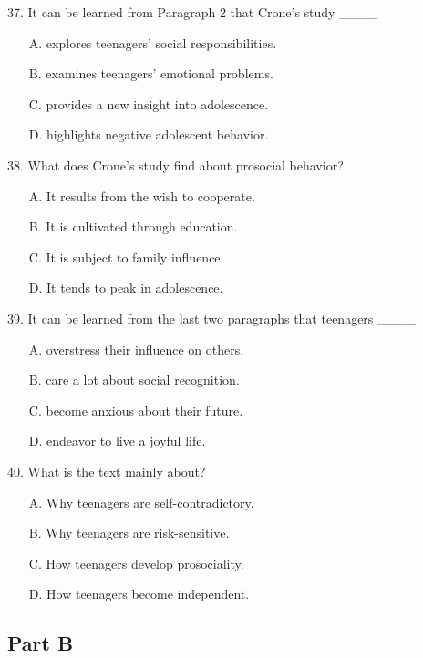 \documentclass[UTF8,11pt]{ctexart}
\begin{document}
37. It can be learned from Paragraph 2 that Crone’s study \_\_\_\_


\begin{itemize}[leftmargin=2em,itemsep=.2em,topsep=.4em]\item[A.] explores teenagers’ social responsibilities.
\item[B.] examines teenagers’ emotional problems.
\item[C.] provides a new insight into adolescence.
\item[D.] highlights negative adolescent behavior.
\end{itemize}

38. What does Crone’s study find about prosocial behavior?


\begin{itemize}[leftmargin=2em,itemsep=.2em,topsep=.4em]\item[A.] It results from the wish to cooperate.
\item[B.] It is cultivated through education.
\item[C.] It is subject to family influence.
\item[D.] It tends to peak in adolescence.
\end{itemize}

39. It can be learned from the last two paragraphs that teenagers \_\_\_\_


\begin{itemize}[leftmargin=2em,itemsep=.2em,topsep=.4em]\item[A.] overstress their influence on others.
\item[B.] care a lot about social recognition.
\item[C.] become anxious about their future.
\item[D.] endeavor to live a joyful life.
\end{itemize}

40. What is the text mainly about?


\begin{itemize}[leftmargin=2em,itemsep=.2em,topsep=.4em]\item[A.] Why teenagers are self-contradictory.
\item[B.] Why teenagers are risk-sensitive.
\item[C.] How teenagers develop prosociality.
\item[D.] How teenagers become independent.
\end{itemize}

\subsection*{\textbf{Part B}}
\end{document}
